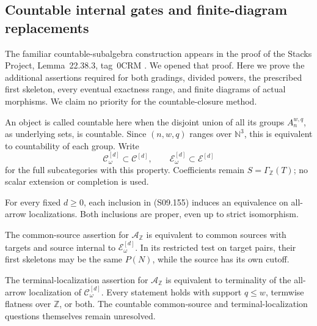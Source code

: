 \subsection{Countable internal gates and finite-diagram replacements}

The familiar countable-subalgebra construction appears in the proof
of the Stacks Project, Lemma~22.38.3, tag~0CRM
\cite{Root_CountableDGA}. We opened that proof. Here we prove the
additional assertions required for both gradings, divided powers,
the prescribed first skeleton, every eventual exactness range, and
finite diagrams of actual morphisms. We claim no priority for the
countable-closure method.

An object is called countable here when the disjoint union of all
its groups $A_n^{w,q}$, as underlying sets, is countable. Since
$(n,w,q)$ ranges over $\mathbb N^3$, this is equivalent to
countability of each group. Write
\[
 \mathcal C^{[d]}_\omega\subset\mathcal C^{[d]},\qquad
 \mathcal E^{[d]}_\omega\subset\mathcal E^{[d]}
 \tag{S09.155}
\]
for the full subcategories with this property. Coefficients remain
$S=\Gamma_{\mathbb Z}(T)$; no scalar extension or completion is used.

\begin{theorem}
\label{AS0929}
For every fixed $d\geq0$, each inclusion in (S09.155) induces
an equivalence on all-arrow localizations. Both inclusions are
proper, even up to strict isomorphism.

The common-source assertion for $\mathcal A_{\mathbb Z}$ is
equivalent to common sources with targets and source internal to
$\mathcal E^{[d]}_\omega$. In its restricted test on target pairs,
their first skeletons may be the same $P(N)$, while the source
has its own cutoff.

The terminal-localization assertion for $\mathcal A_{\mathbb Z}$
is equivalent to terminality of the all-arrow localization of
$\mathcal C^{[d]}_\omega$. Every statement holds with support
$q\leq w$, termwise flatness over $\mathbb Z$, or both.
The countable common-source and terminal-localization questions
themselves remain unresolved.
\end{theorem}

